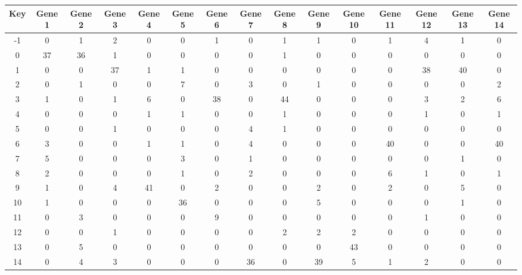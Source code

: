 \begin{tabular}{|c|c|c|c|c|c|c|c|c|c|c|c|c|c|c|}
\hline
Key & Gene 1 & Gene 2 & Gene 3 & Gene 4 & Gene 5 & Gene 6 & Gene 7 & Gene 8 & Gene 9 & Gene 10 & Gene 11 & Gene 12 & Gene 13 & Gene 14 \\
\hline
-1 & 0 & 1 & 2 & 0 & 0 & 1 & 0 & 1 & 1 & 0 & 1 & 4 & 1 & 0 \\
0 & 37 & 36 & 1 & 0 & 0 & 0 & 0 & 1 & 0 & 0 & 0 & 0 & 0 & 0 \\
1 & 0 & 0 & 37 & 1 & 1 & 0 & 0 & 0 & 0 & 0 & 0 & 38 & 40 & 0 \\
2 & 0 & 1 & 0 & 0 & 7 & 0 & 3 & 0 & 1 & 0 & 0 & 0 & 0 & 2 \\
3 & 1 & 0 & 1 & 6 & 0 & 38 & 0 & 44 & 0 & 0 & 0 & 3 & 2 & 6 \\
4 & 0 & 0 & 0 & 1 & 1 & 0 & 0 & 1 & 0 & 0 & 0 & 1 & 0 & 1 \\
5 & 0 & 0 & 1 & 0 & 0 & 0 & 4 & 1 & 0 & 0 & 0 & 0 & 0 & 0 \\
6 & 3 & 0 & 0 & 1 & 1 & 0 & 4 & 0 & 0 & 0 & 40 & 0 & 0 & 40 \\
7 & 5 & 0 & 0 & 0 & 3 & 0 & 1 & 0 & 0 & 0 & 0 & 0 & 1 & 0 \\
8 & 2 & 0 & 0 & 0 & 1 & 0 & 2 & 0 & 0 & 0 & 6 & 1 & 0 & 1 \\
9 & 1 & 0 & 4 & 41 & 0 & 2 & 0 & 0 & 2 & 0 & 2 & 0 & 5 & 0 \\
10 & 1 & 0 & 0 & 0 & 36 & 0 & 0 & 0 & 5 & 0 & 0 & 0 & 1 & 0 \\
11 & 0 & 3 & 0 & 0 & 0 & 9 & 0 & 0 & 0 & 0 & 0 & 1 & 0 & 0 \\
12 & 0 & 0 & 1 & 0 & 0 & 0 & 0 & 2 & 2 & 2 & 0 & 0 & 0 & 0 \\
13 & 0 & 5 & 0 & 0 & 0 & 0 & 0 & 0 & 0 & 43 & 0 & 0 & 0 & 0 \\
14 & 0 & 4 & 3 & 0 & 0 & 0 & 36 & 0 & 39 & 5 & 1 & 2 & 0 & 0 \\
\hline
\end{tabular}